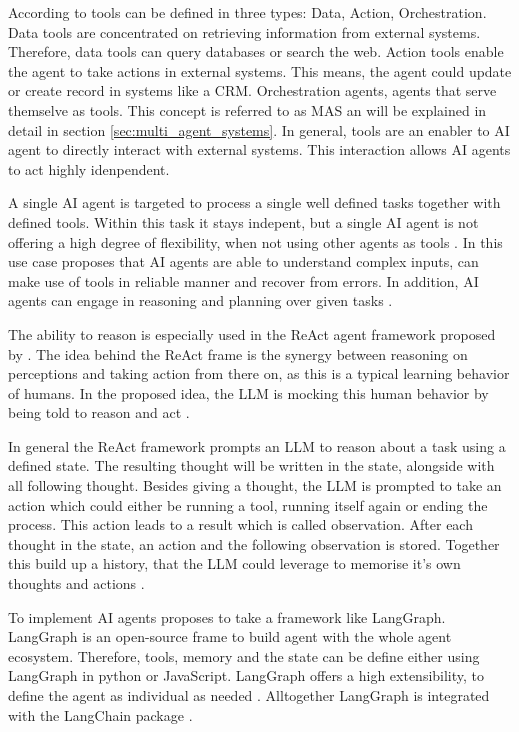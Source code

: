 \documentclass[a4paper,oneside,bibliography=totoc]{scrbook}
\begin{document}
According to \citet{OpenAI2025} tools can be defined in three types: Data, Action, Orchestration. Data tools are concentrated on retrieving information from external systems. Therefore, data tools can query databases or search the web. Action tools enable the agent to take actions in external systems. This means, the agent could update or create record in systems like a \ac{CRM}. Orchestration agents, agents that serve themselve as tools. This concept is referred to as \ac{MAS} an will be explained in detail in section \ref{sec:multi_agent_systems}. In general, tools are an enabler to AI agent to directly interact with external systems. This interaction allows \ac{AI} agents to act highly idenpendent.

A single \ac{AI} agent is targeted to process a single well defined tasks together with defined tools. Within this task it stays indepent, but a single \ac{AI} agent is not offering a high degree of flexibility, when not using other agents as tools \cite{Sapkota2025}. In this use case \citet{Anthropic2024} proposes that \ac{AI} agents are able to understand complex inputs, can make use of tools in reliable manner and recover from errors. In addition, \ac{AI} agents can engage in reasoning and planning over given tasks \cite{Anthropic2024}.

The ability to reason is especially used in the ReAct agent framework proposed by \citet{Yao2023}. The idea behind the ReAct frame is the synergy between reasoning on perceptions and taking action from there on, as this is a typical learning behavior of humans. In the proposed idea, the \ac{LLM} is mocking this human behavior by being told to reason and act \cite{Yao2023}.

In general the ReAct framework prompts an \ac{LLM} to reason about a task using a defined state. The resulting thought will be written in the state, alongside with all following thought. Besides giving a thought, the \ac{LLM} is prompted to take an action which could either be running a tool, running itself again or ending the process. This action leads to a result which is called observation. After each thought in the state, an action and the following observation is stored. Together this build up a history, that the \ac{LLM} could leverage to memorise it's own thoughts and actions \cite{Yao2023}.

To implement \ac{AI} agents \citet{Anthropic2024} proposes to take a framework like LangGraph. LangGraph is an open-source frame to build agent with the whole agent ecosystem. Therefore, tools, memory and the state can be define either using LangGraph in python or JavaScript. LangGraph offers a high extensibility, to define the agent as individual as needed \cite{LangChain2025}. Alltogether LangGraph is integrated with the LangChain package \cite{LangChain2025a}.
\end{document}
